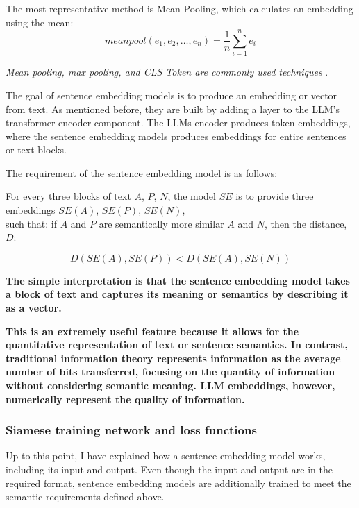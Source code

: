 \documentclass{wseas}
\begin{document}
The most representative method is Mean Pooling, which calculates an
embedding using the mean:
\begin{equation}
  meanpool(e_1, e_2, \ldots, e_n) = \frac{1}{n} \sum_{i=1}^{n} e_i
\end{equation}

\textit{Mean pooling, max pooling, and CLS Token are commonly used techniques} \cite{sbert}.

The goal of sentence embedding models is to produce an embedding or
vector from text. As mentioned before, they are built by adding a layer
to the LLM's transformer encoder component. The LLMs encoder produces token
embeddings, where the sentence embedding models produces embeddings for
entire sentences or text blocks.

The requirement of the sentence embedding model is as follows:

For every three blocks of text \(A\), \(P\), \(N\), the model \(SE\) is
to provide three embeddings \(SE(A)\), \(SE(P)\), \(SE(N)\),\\
such that: if \(A\) and \(P\) are semantically more similar \(A\) and
\(N\), then the distance, $D$: 

\begin{equation}
   D(SE(A), SE(P)) < D(SE(A), SE(N))
\end{equation}

\textbf{The simple interpretation is that the sentence embedding model
takes a block of text and captures its meaning or semantics by
describing it as a vector.}

\textbf{This is an extremely useful feature because it allows for the 
quantitative representation of text or sentence semantics. In contrast, 
traditional information theory represents information as the 
average number of bits transferred, focusing on the quantity of information 
without considering semantic meaning. LLM embeddings, however, numerically 
represent the quality of information.}

\subsubsection{Siamese training network and loss functions}

Up to this point, I have explained how a sentence embedding model works,
including its input and output. Even though the input and output are in
the required format, sentence embedding models are additionally trained
to meet the semantic requirements defined above.
\end{document}
